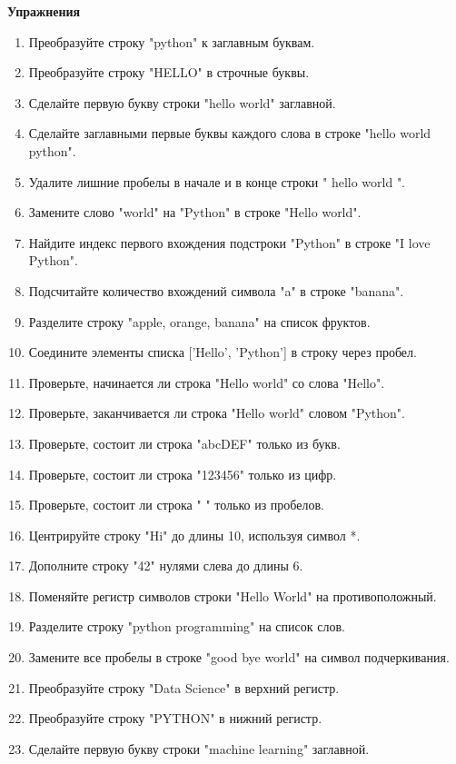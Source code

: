 \documentclass[a4,12pt]{article}
\theoremstyle{remark}
\begin{document}
\textbf{Упражнения}
\begin{enumerate}
    \item Преобразуйте строку "python" к заглавным буквам.
    \item Преобразуйте строку "HELLO" в строчные буквы.
    \item Сделайте первую букву строки "hello world" заглавной.
    \item Сделайте заглавными первые буквы каждого слова в строке "hello world python".
    \item Удалите лишние пробелы в начале и в конце строки " hello world ".
    \item Замените слово "world" на "Python" в строке "Hello world".
    \item Найдите индекс первого вхождения подстроки "Python" в строке "I love Python".
    \item Подсчитайте количество вхождений символа "a" в строке "banana".
    \item Разделите строку "apple, orange, banana" на список фруктов.
    \item Соедините элементы списка ['Hello', 'Python'] в строку через пробел.
    \item Проверьте, начинается ли строка "Hello world" со слова "Hello".
    \item Проверьте, заканчивается ли строка "Hello world" словом "Python".
    \item Проверьте, состоит ли строка "abcDEF" только из букв.
    \item Проверьте, состоит ли строка "123456" только из цифр.
    \item Проверьте, состоит ли строка " " только из пробелов.
    \item Центрируйте строку "Hi" до длины 10, используя символ *.
    \item Дополните строку "42" нулями слева до длины 6.
    \item Поменяйте регистр символов строки "Hello World" на противоположный.
    \item Разделите строку "python programming" на список слов.
    \item Замените все пробелы в строке "good bye world" на символ подчеркивания.
    \item Преобразуйте строку "Data Science" в верхний регистр.
    \item Преобразуйте строку "PYTHON" в нижний регистр.
    \item Сделайте первую букву строки "machine learning" заглавной.

\end{enumerate}
\end{document}
